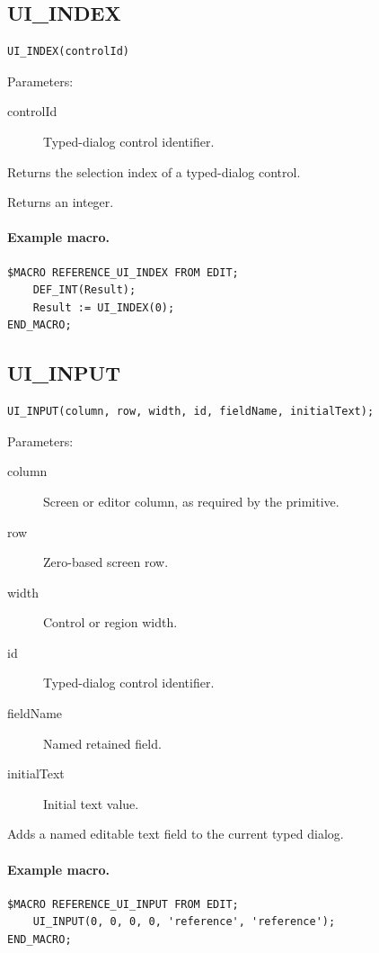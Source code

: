 \documentclass[a4paper,10pt,twoside,openany]{book}
\newenvironment{mrmacextension}{\begin{changebar}}{\end{changebar}}
\begin{document}
\begin{mrmacextension}
\label{prim:intrinsic-ui-index}
\subsection*{UI\_INDEX}
\begin{verbatim}
UI_INDEX(controlId)
\end{verbatim}
Parameters:
\begin{description}
\item[controlId] Typed-dialog control identifier.
\end{description}

Returns the selection index of a typed-dialog control.

Returns an integer.

\paragraph{Example macro.}
\begin{verbatim}
$MACRO REFERENCE_UI_INDEX FROM EDIT;
    DEF_INT(Result);
    Result := UI_INDEX(0);
END_MACRO;
\end{verbatim}
\end{mrmacextension}

\begin{mrmacextension}
\label{prim:procedure-ui-input}
\subsection*{UI\_INPUT}
\begin{verbatim}
UI_INPUT(column, row, width, id, fieldName, initialText);
\end{verbatim}
Parameters:
\begin{description}
\item[column] Screen or editor column, as required by the primitive.
\item[row] Zero-based screen row.
\item[width] Control or region width.
\item[id] Typed-dialog control identifier.
\item[fieldName] Named retained field.
\item[initialText] Initial text value.
\end{description}

Adds a named editable text field to the current typed dialog.

\paragraph{Example macro.}
\begin{verbatim}
$MACRO REFERENCE_UI_INPUT FROM EDIT;
    UI_INPUT(0, 0, 0, 0, 'reference', 'reference');
END_MACRO;
\end{verbatim}
\end{mrmacextension}
\end{document}

